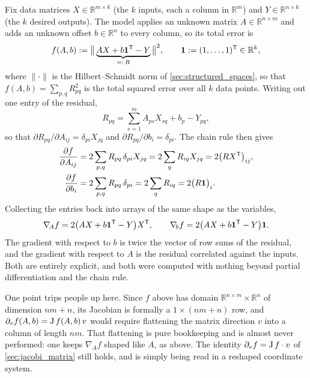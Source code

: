 \begin{aiexample}
\label{ex:least_squares_matrix_gradient}
Fix data matrices $X \in \mathbb{R}^{m\times k}$ (the $k$ inputs, each a column in
$\mathbb{R}^m$) and $Y \in \mathbb{R}^{n\times k}$ (the $k$ desired outputs). The model applies
an unknown matrix $A \in \mathbb{R}^{n\times m}$ and adds an unknown offset
$b \in \mathbb{R}^n$ to every column, so its total error is
\[f(A,b) := \big\lVert \underbrace{AX + b\mathbf{1}^{\mathsf{T}} - Y}_{=:\,R} \big\rVert^2,
  \qquad \mathbf{1} := (1,\dots,1)^{\mathsf{T}} \in \mathbb{R}^k,\]
where $\lVert\cdot\rVert$ is the Hilbert--Schmidt norm of \cref{sec:structured_spaces}, so that
$f(A,b) = \sum_{p,q} R_{pq}^2$ is the total squared error over all $k$ data points. Writing out
one entry of the residual,
\[R_{pq} = \sum_{s=1}^{m} A_{ps}X_{sq} + b_p - Y_{pq},\]
so that $\partial R_{pq}/\partial A_{ij} = \delta_{pi}X_{jq}$ and
$\partial R_{pq}/\partial b_i = \delta_{pi}$. The chain rule then gives
\begin{align}
  \frac{\partial f}{\partial A_{ij}} &= 2\sum_{p,q} R_{pq}\,\delta_{pi}X_{jq}
    = 2\sum_{q} R_{iq}X_{jq} = 2\big(RX^{\mathsf{T}}\big)_{ij}, \nonumber \\
  \frac{\partial f}{\partial b_i} &= 2\sum_{p,q} R_{pq}\,\delta_{pi}
    = 2\sum_{q} R_{iq} = 2\big(R\mathbf{1}\big)_i. \nonumber
\end{align}
Collecting the entries back into arrays of the same shape as the variables,
\[\nabla_{\!A} f = 2\big(AX + b\mathbf{1}^{\mathsf{T}} - Y\big)X^{\mathsf{T}}, \qquad
  \nabla_{\!b} f = 2\big(AX + b\mathbf{1}^{\mathsf{T}} - Y\big)\mathbf{1}.\]
The gradient with respect to $b$ is twice the vector of row sums of the residual, and the
gradient with respect to $A$ is the residual correlated against the inputs. Both are entirely
explicit, and both were computed with nothing beyond partial differentiation and the chain rule.
\end{aiexample}

\begin{remark}
One point trips people up here. Since $f$ above has domain
$\mathbb{R}^{n\times m}\times\mathbb{R}^n$ of dimension $nm+n$, its Jacobian is formally a
$1\times(nm+n)$ row, and $\partial_v f(A,b) = \operatorname{J} f(A,b)\,v$ would require flattening the matrix
direction $v$ into a column of length $nm$. That flattening is pure bookkeeping and is almost
never performed: one keeps $\nabla_{\!A}f$ shaped like $A$, as above. The identity
$\partial_vf = \operatorname{J} f\cdot v$ of \cref{sec:jacobi_matrix} still holds, and is simply being read
in a reshaped coordinate system.
\end{remark}

